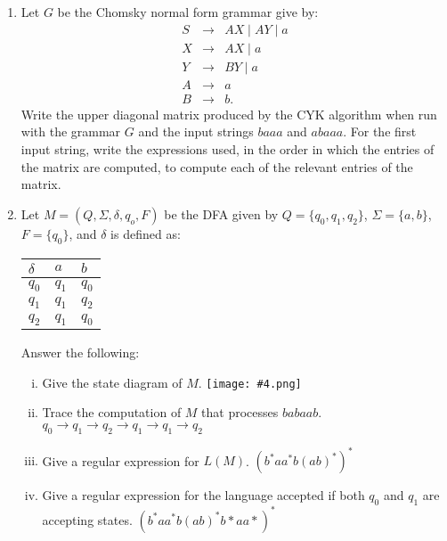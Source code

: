\documentclass{article}
\begin{document}
\begin{enumerate}
   \item Let $G$ be the Chomsky normal form grammar give by:
     \begin{eqnarray*}
      S &\rightarrow& AX \mid AY \mid a \\
      X &\rightarrow& AX \mid a\\
      Y &\rightarrow& BY \mid a\\
      A &\rightarrow& a\\
      B &\rightarrow& b.
     \end{eqnarray*}
     Write the upper diagonal matrix produced by the CYK algorithm
     when run with the grammar $G$ and the input strings $baaa$ and
     $abaaa$. For the first input string, write the expressions used,
     in the order in which the entries of the matrix are computed,
     to compute each of the relevant entries of the matrix.
     
     \newline
     
\item Let $M = (Q, \Sigma, \delta, q_o, F)$ be the DFA given by
$Q = \{q_0, q_1, q_2\}$, $\Sigma = \{a, b\}$, $F = \{q_0\}$, and
  $\delta$ is defined as:
\begin{center}
\begin{tabular}{l|ll}
$\delta$&$a$&$b$\\
\hline
$q_0$&$q_1$&$q_0$\\
$q_1$&$q_1$&$q_2$\\
$q_2$&$q_1$&$q_0$
\end{tabular}
\end{center}

Answer the following:
\begin{enumerate}[i)]
\item Give the state diagram of $M$.
\newline \texttt{[image: \#4.png]}
\item Trace the computation of $M$ that processes $babaab$.
\newline $q_0 \rightarrow q_1 \rightarrow q_2 \rightarrow q_1 \rightarrow q_1 \rightarrow q_2$
\item Give a regular expression for $L(M)$.
\newline $(b^*aa^*b(ab)^*)^*$
\item Give a regular expression for the language accepted if both
  $q_0$ and $q_1$ are accepting states.
  \newline $(b^*aa^*b(ab)^*b*aa*)^*$
\end{enumerate}


\end{enumerate}
\end{document}
